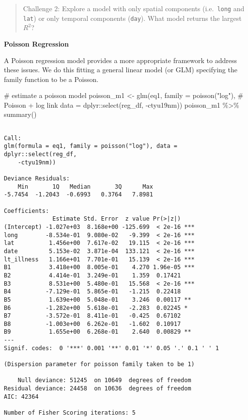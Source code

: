 \documentclass[
  letterpaper,
  krantz2]{style/krantz}
\newenvironment{Shaded}{\begin{snugshade}}{\end{snugshade}}
\newcommand{\AttributeTok}[1]{\textcolor[rgb]{0.40,0.45,0.13}{#1}}
\newcommand{\CommentTok}[1]{\textcolor[rgb]{0.37,0.37,0.37}{#1}}
\newcommand{\FunctionTok}[1]{\textcolor[rgb]{0.28,0.35,0.67}{#1}}
\newcommand{\NormalTok}[1]{\textcolor[rgb]{0.00,0.23,0.31}{#1}}
\newcommand{\OtherTok}[1]{\textcolor[rgb]{0.00,0.23,0.31}{#1}}
\newcommand{\SpecialCharTok}[1]{\textcolor[rgb]{0.37,0.37,0.37}{#1}}
\newcommand{\StringTok}[1]{\textcolor[rgb]{0.13,0.47,0.30}{#1}}
\begin{document}
\begin{quote}
Challenge 2: Explore a model with only spatial components
(i.e.~\texttt{long} and \texttt{lat}) or only temporal components
(\texttt{day}). What model returns the largest \(R^{2}\)?
\end{quote}

\textbf{Poisson Regression}

A Poisson regression model provides a more appropriate framework to
address these issues. We do this fitting a general linear model (or GLM)
specifying the family function to be a Poisson.

\begin{Shaded}
\begin{Highlighting}[]
\CommentTok{\# estimate a poisson model}
\NormalTok{poisson\_m1 }\OtherTok{\textless{}{-}} \FunctionTok{glm}\NormalTok{(eq1,}
                \AttributeTok{family =} \FunctionTok{poisson}\NormalTok{(}\StringTok{"log"}\NormalTok{), }\CommentTok{\# Poisson + log link}
                \AttributeTok{data =}\NormalTok{ dplyr}\SpecialCharTok{::}\FunctionTok{select}\NormalTok{(reg\_df, }\SpecialCharTok{{-}}\NormalTok{ctyu19nm))}
\NormalTok{poisson\_m1 }\SpecialCharTok{\%\textgreater{}\%} \FunctionTok{summary}\NormalTok{()}
\end{Highlighting}
\end{Shaded}

\begin{verbatim}

Call:
glm(formula = eq1, family = poisson("log"), data = dplyr::select(reg_df, 
    -ctyu19nm))

Deviance Residuals: 
    Min       1Q   Median       3Q      Max  
-5.7454  -1.2043  -0.6993   0.3764   7.8981  

Coefficients:
              Estimate Std. Error  z value Pr(>|z|)    
(Intercept) -1.027e+03  8.168e+00 -125.699  < 2e-16 ***
long        -8.534e-01  9.080e-02   -9.399  < 2e-16 ***
lat          1.456e+00  7.617e-02   19.115  < 2e-16 ***
date         5.153e-02  3.871e-04  133.121  < 2e-16 ***
lt_illness   1.166e+01  7.701e-01   15.139  < 2e-16 ***
B1           3.418e+00  8.005e-01    4.270 1.96e-05 ***
B2           4.414e-01  3.249e-01    1.359  0.17421    
B3           8.531e+00  5.480e-01   15.568  < 2e-16 ***
B4          -7.129e-01  5.865e-01   -1.215  0.22418    
B5           1.639e+00  5.048e-01    3.246  0.00117 ** 
B6          -1.282e+00  5.618e-01   -2.283  0.02245 *  
B7          -3.572e-01  8.411e-01   -0.425  0.67102    
B8          -1.003e+00  6.262e-01   -1.602  0.10917    
B9           1.655e+00  6.268e-01    2.640  0.00829 ** 
---
Signif. codes:  0 '***' 0.001 '**' 0.01 '*' 0.05 '.' 0.1 ' ' 1

(Dispersion parameter for poisson family taken to be 1)

    Null deviance: 51245  on 10649  degrees of freedom
Residual deviance: 24458  on 10636  degrees of freedom
AIC: 42364

Number of Fisher Scoring iterations: 5
\end{verbatim}
\end{document}
